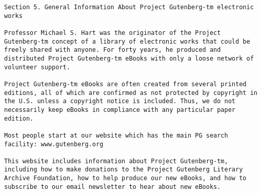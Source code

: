\documentclass[oneside]{book}
\begin{document}
\begin{verbatim}
Section 5. General Information About Project Gutenberg-tm electronic works

Professor Michael S. Hart was the originator of the Project
Gutenberg-tm concept of a library of electronic works that could be
freely shared with anyone. For forty years, he produced and
distributed Project Gutenberg-tm eBooks with only a loose network of
volunteer support.

Project Gutenberg-tm eBooks are often created from several printed
editions, all of which are confirmed as not protected by copyright in
the U.S. unless a copyright notice is included. Thus, we do not
necessarily keep eBooks in compliance with any particular paper
edition.

Most people start at our website which has the main PG search
facility: www.gutenberg.org

This website includes information about Project Gutenberg-tm,
including how to make donations to the Project Gutenberg Literary
Archive Foundation, how to help produce our new eBooks, and how to
subscribe to our email newsletter to hear about new eBooks.
\end{verbatim}
\end{document}
